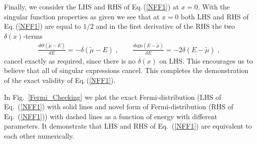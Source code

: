 \documentclass[sn-mathphys,Numbered]{sn-jnl}
\theoremstyle{thmstyleone}%
\theoremstyle{thmstyletwo}%
\theoremstyle{thmstylethree}%
\begin{document}
Finally, we consider the LHS and RHS of Eq.\,(\ref{NFF1}) at $x=0$. With the singular function properties as given we see that at $x=0$ both LHS and RHS of Eq.\,(\ref{NFF1}) are equal to $1/2$ and in the first derivative of the  RHS the two $\delta(x)$-terms 
\begin{align}\label{NFF1b}
\frac{d\Theta(\tilde\mu-E)}{dE}=-\delta(\tilde\mu-E)\;,\qquad 
\frac{d\mathrm{sgn}(E -\tilde\mu)}{dE}=-2\delta(E-\tilde\mu)\;, 
 \end{align}
cancel exactly as required, since there is no $\delta(x)$ on LHS. This encourages us to believe that all of singular expressions cancel. This completes the demonstration of the exact validity of  Eq.\,(\ref{NFF1}). 

In Fig.~\ref{Fermi_Checking} we plot the exact Fermi-distribution (LHS of Eq.~(\ref{NFF1}) with solid lines and novel form of Fermi-distribution (RHS of Eq.~(\ref{NFF1})) with dashed lines as a function of energy with different parameters. It demonstrate that 
LHS and RHS of Eq.~(\ref{NFF1}) are equivalent to each other numerically.
\end{document}

